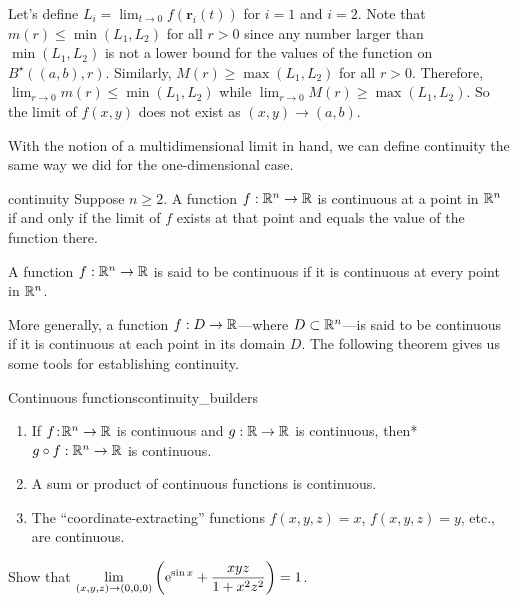 \documentclass[prettycode,shellescape]{watsonbook}
\begin{document}
\begin{solution}[title=Proof]
  Let's define $L_i = \lim_{t \to 0}f(\mathbf{r}_i(t))$ for $i=1$ and
  $i=2$. Note that $m(r) \leq \min(L_1,L_2)$ for all $r > 0$ since any
  number larger than $\min(L_1,L_2)$ is not a lower bound for the
  values of the function on $B^\star((a,b),r)$. Similarly,
  $M(r) \geq \max(L_1,L_2)$ for all $r > 0$. Therefore,
  $\lim_{r\to 0} m(r) \leq \min(L_1, L_2)$ while
  $\lim_{r\to 0} M(r) \geq \max(L_1,L_2)$. So the limit of $f(x,y)$ does not
  exist as $(x,y) \to (a,b)$.

\end{solution}

With the notion of a multidimensional limit in hand, we can define
continuity the same way we did for the one-dimensional case.

\begin{defn}{}{continuity}
  Suppose $n \geq 2$. A function $f: \mathbb{R}^n \to \mathbb{R}$ is continuous at a
  point in $\mathbb{R}^n$ if and only if the limit of $f$ exists at that point
  and equals the value of the function there.

  A function $f: \mathbb{R}^n \to \mathbb{R}$ is said to be continuous if it is
  continuous at every point in $\mathbb{R}^n$.
\end{defn}

More generally, a function $f:D \to \mathbb{R}$---where $D \subset \mathbb{R}^n$---is
said to be continuous if it is continuous at each point in its
domain $D$. The following theorem gives us some tools for establishing
continuity. 

\begin{theo}{Continuous functions}{continuity_builders}
  \begin{enumerate}[leftmargin = 12pt]
  \item If $f  \!:\! \mathbb{R}^n \to \mathbb{R}$ is continuous and $g: \mathbb{R} \to \mathbb{R}$
    is continuous, then* $g\circ f :\mathbb{R}^n \to \mathbb{R}$ is
    continuous. 
  \item A sum or product of continuous functions is continuous. 
  \item The ``coordinate-extracting'' functions $f(x,y,z) = x$, $f(x,y,z) = y$, etc., are
    continuous.
  \end{enumerate}
\end{theo}

\begin{example}{}{}
  Show that $\displaystyle{\lim_{(x,y,z) \to (0,0,0)}\left(\mathrm{e}^{\sin x} + \frac{xyz}{1 + x^2
        z^2}\right)} = 1$. 
\end{example}
\end{document}
